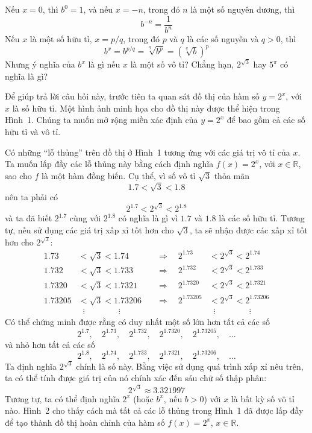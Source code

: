 \begin{minipage}[t]{0.708\textwidth}
    \fontsize{8.8pt}{11.5pt}\selectfont
    Nếu $x = 0$, thì $b^0 = 1$, và nếu $x = -n$, trong đó $n$ là một số nguyên dương, thì
    \[
    b^{-n} = \frac{1}{b^n}
    \]
    Nếu $x$ là một số hữu tỉ, $x = p/q$, trong đó $p$ và $q$ là các số nguyên và $q > 0$, thì
    \[
    b^x = b^{p/q} = \sqrt[q]{b^p} = (\sqrt[q]{b})^p
    \]
    Nhưng ý nghĩa của $b^x$ là gì nếu $x$ là một số vô tỉ? Chẳng hạn, $2^{\sqrt{3}}$ hay $5^\pi$ có nghĩa là gì?

    Để giúp trả lời câu hỏi này, trước tiên ta quan sát đồ thị của hàm số $y = 2^x$, với $x$ là số hữu tỉ. Một hình ảnh minh họa cho đồ thị này được thể hiện trong Hình~1. Chúng ta muốn mở rộng miền xác định của $y = 2^x$ để bao gồm cả các số hữu tỉ và vô tỉ.

    Có những ``lỗ thủng'' trên đồ thị ở Hình~1 tương ứng với các giá trị vô tỉ của $x$. Ta muốn lấp đầy các lỗ thủng này bằng cách định nghĩa $f(x) = 2^x$, với $x \in \mathbb{R}$, sao cho $f$ là một hàm đồng biến. Cụ thể, vì số vô tỉ $\sqrt{3}$ thỏa mãn
    \[
    1.7 < \sqrt{3} < 1.8
    \]
    nên ta phải có
    \[
    2^{1.7} < 2^{\sqrt{3}} < 2^{1.8}
    \]
    và ta đã biết $2^{1.7}$ cùng với $2^{1.8}$ có nghĩa là gì vì $1.7$ và $1.8$ là các số hữu tỉ. Tương tự, nếu sử dụng các giá trị xấp xỉ tốt hơn cho $\sqrt{3}$, ta sẽ nhận được các xấp xỉ tốt hơn cho $2^{\sqrt{3}}$:
    \[
    \begin{alignedat}{2}
    1.73 &< \sqrt{3} < 1.74 &\quad \Rightarrow \quad 2^{1.73} &< 2^{\sqrt{3}} < 2^{1.74} \\
    1.732 &< \sqrt{3} < 1.733 &\quad \Rightarrow \quad 2^{1.732} &< 2^{\sqrt{3}} < 2^{1.733} \\
    1.7320 &< \sqrt{3} < 1.7321 &\quad \Rightarrow \quad 2^{1.7320} &< 2^{\sqrt{3}} < 2^{1.7321} \\
    1.73205 &< \sqrt{3} < 1.73206 &\quad \Rightarrow \quad 2^{1.73205} &< 2^{\sqrt{3}} < 2^{1.73206} \\
    &\;\;\vdots \qquad\qquad \vdots &&\;\;\vdots \qquad\qquad \vdots
    \end{alignedat}
    \]
    Có thể chứng minh được rằng có duy nhất một số lớn hơn tất cả các số
    \[
    2^{1.7},\quad 2^{1.73},\quad 2^{1.732},\quad 2^{1.7320},\quad 2^{1.73205},\quad \dots
    \]
    và nhỏ hơn tất cả các số
    \[
    2^{1.8},\quad 2^{1.74},\quad 2^{1.733},\quad 2^{1.7321},\quad 2^{1.73206},\quad \dots
    \]
    Ta định nghĩa $2^{\sqrt{3}}$ chính là số này. Bằng việc sử dụng quá trình xấp xỉ nêu trên, ta có thể tính được giá trị của nó chính xác đến sáu chữ số thập phân:
    \[
    2^{\sqrt{3}} \approx 3.321997
    \]
    Tương tự, ta có thể định nghĩa $2^x$ (hoặc $b^x$, nếu $b > 0$) với $x$ là bất kỳ số vô tỉ nào. Hình~2 cho thấy cách mà tất cả các lỗ thủng trong Hình~1 đã được lấp đầy để tạo thành đồ thị hoàn chỉnh của hàm số $f(x) = 2^x$, $x \in \mathbb{R}$.
\end{minipage}